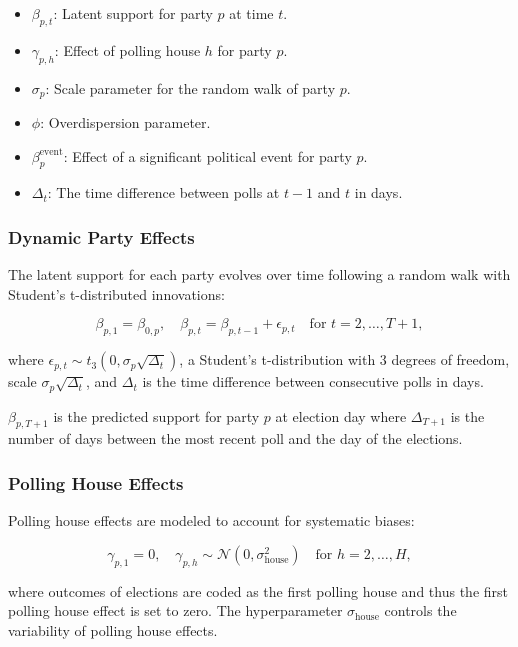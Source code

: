 \documentclass[
  letterpaper,
  DIV=11,
  numbers=noendperiod]{scrartcl}
\providecommand{\tightlist}{%
  \setlength{\itemsep}{0pt}\setlength{\parskip}{0pt}}\usepackage{longtable,booktabs,array}
\begin{document}
\begin{itemize}
\tightlist
\item
  \(\beta_{p,t}\): Latent support for party \(p\) at time \(t\).
\item
  \(\gamma_{p,h}\): Effect of polling house \(h\) for party \(p\).
\item
  \(\sigma_p\): Scale parameter for the random walk of party \(p\).
\item
  \(\phi\): Overdispersion parameter.
\item
  \(\beta^{\text{event}}_p\): Effect of a significant political event
  for party \(p\).
\item
  \(\Delta_t\): The time difference between polls at \(t-1\) and \(t\)
  in days.
\end{itemize}

\subsubsection{Dynamic Party Effects}\label{dynamic-party-effects}

The latent support for each party evolves over time following a random
walk with Student's t-distributed innovations:

\[
\beta_{p,1} = \beta_{0,p}, \quad \beta_{p,t} = \beta_{p,t-1} + \epsilon_{p,t} \quad \text{for } t = 2, \dots, T+1,
\]

where
\(\epsilon_{p,t} \sim t_3\left(0, \sigma_p \sqrt{\Delta_t}\right)\), a
Student's t-distribution with 3 degrees of freedom, scale
\(\sigma_p \sqrt{\Delta_t}\), and \(\Delta_t\) is the time difference
between consecutive polls in days.

\(\beta_{p, T + 1}\) is the predicted support for party \(p\) at
election day where \(\Delta_{T+1}\) is the number of days between the
most recent poll and the day of the elections.

\subsubsection{Polling House Effects}\label{polling-house-effects}

Polling house effects are modeled to account for systematic biases:

\[
\gamma_{p,1} = 0, \quad \gamma_{p,h} \sim \mathcal{N}\left(0, \sigma_{\text{house}}^2\right) \quad \text{for } h = 2, \dots, H,
\]

where outcomes of elections are coded as the first polling house and
thus the first polling house effect is set to zero. The hyperparameter
\(\sigma_{\text{house}}\) controls the variability of polling house
effects.
\end{document}
